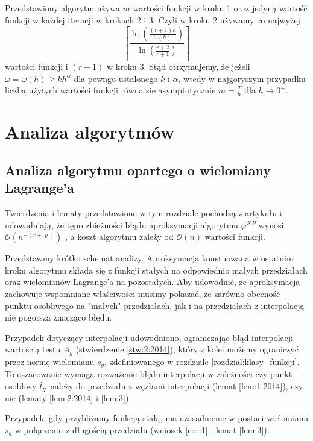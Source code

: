 \documentclass[oik, pdftex, man]{mgrwms}
\begin{document}
    Przedstawiony algorytm używa $m$ wartości funkcji w kroku 1 oraz jedyną wartość funkcji w każdej iteracji w krokach 2 i 3. Czyli w kroku 2 używamy co najwyżej
    \begin{equation*}
        \left\lceil\frac{\ln \left(\frac{(r+1) h}{\omega(h)}\right)}{\ln \left(\frac{r+2}{r+1}\right)}\right\rceil
    \end{equation*}
    wartości funkcji i $(r-1)$ w kroku 3.
    Stąd otrzymujemy, że jeżeli $\omega = \omega(h) \geq kh^{\alpha}$ dla pewngo ustalonego $k$ i $\alpha$, wtedy w najgoryszym przypadku liczba użytych wartości funkcji równa sie asymptotycznie $m = \frac{T}{h}$ dla $h \rightarrow 0^{+}$.


\mgrclosechapter


\chapter{Analiza algorytmów} \label{rozdzial:analiza_alg}


\section{Analiza algorytmu opartego o wielomiany Lagrange'a}

    Twierdzenia i lematy przedstawione w tym rozdziale pochodzą z artykułu \cite{CoDF} i udowadniają, że tępo zbieżności błądu aproksymacji algorytmu $\varphi^{KP}$ wynosi $\mathcal{O}(n^{-(r+\varrho)})$ , a koszt algorytmu zależy od $\mathcal{O}(n)$ wartości funkcji.

    Przedstawmy krótko schemat analizy. Aproksymacja konstuowana w ostatnim kroku algorytmu składa się z funkcji stałych na odpowiednio małych przedziałach oraz wielomianów Lagrange'a na pozostałych. Aby udowodnić, że aproksymacja zachowuje wspomniane właściwości musimy pokazać, że zarówno obecność punktu osobliwego na "małych" przedziałach, jak i na przedziałach z interpolacją nie pogorsza znacząco błędu.

    Przypadek dotyczący interpolacji udowodniono, ograniczając błąd interpolacji wartością testu $A_{g}$ (stwierdzenie \ref{stw:2:2014}), który z kolei możemy ograniczyć przez normę wielomianu $s_{g}$, zdefiniowanego w rozdziale \ref{rozdzial:klasy_funkcji}. To oszacowanie wymaga rozważenie błędu interpolacji w zależności czy punkt osobliwy $\hat{t}_{g}$ należy do przedziału z węzłami interpolacji (lemat \ref{lem:1:2014}), czy nie (lematy \ref{lem:2:2014} i \ref{lem:3}).
    
    Przypadek, gdy przybliżamy funkcją stałą, ma uzasadnienie w postaci wielomianu $s_{g}$ w połączeniu z długością przedziału (wniosek \ref{cor:1} i lemat \ref{lem:3}).
\end{document}
